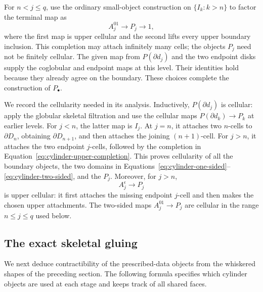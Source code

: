 For \(n<j\le q\), use the ordinary small-object construction on
\(\{I_k:k>n\}\) to factor the terminal map as
\begin{equation}\label{eq:cylinder-upper-completion}
 A_j^{01}\longrightarrow P_j\longrightarrow 1,
\end{equation}
where the first map is upper cellular and the second lifts every
upper boundary inclusion.  This completion may attach infinitely
many cells; the objects \(P_j\) need not be finitely cellular.
The given map from \(P(\partial d_j)\)
and the two endpoint disks supply the coglobular and endpoint maps at
this level.  Their identities hold because they already agree on the
boundary.  These choices complete the construction of \(P_\bullet\).

We record the cellularity needed in its analysis.  Inductively,
\(P(\partial d_j)\) is cellular: apply the globular skeletal
filtration and use the cellular maps
\(P(\partial d_k)\to P_k\) at earlier levels.  For \(j<n\),
the latter map is \(I_j\).  At \(j=n\), it attaches two
\(n\)-cells to \(\partial D_n\), obtaining
\(\partial D_{n+1}\), and then attaches the joining
\((n+1)\)-cell.  For \(j>n\), it attaches the two endpoint
\(j\)-cells, followed by the completion in
Equation~\eqref{eq:cylinder-upper-completion}.  This proves cellularity
of all the boundary objects, the two domains in
Equations~\eqref{eq:cylinder-one-sided}--\eqref{eq:cylinder-two-sided},
and the \(P_j\).  Moreover, for \(j>n\),
\begin{equation}\label{eq:cylinder-upper-one-sided}
                     A_j^\epsilon\longrightarrow P_j
\end{equation}
is upper cellular: it first attaches the missing endpoint \(j\)-cell
and then makes the chosen upper attachments.  The two-sided maps
\(A_j^{01}\to P_j\) are cellular in the range \(n\le j\le q\)
used below.

\subsection{The exact skeletal gluing}

We next deduce contractibility of the prescribed-data objects from the
whiskered shapes of the preceding section.  The following formula
specifies which cylinder objects are used at each stage and keeps track
of all shared faces.

